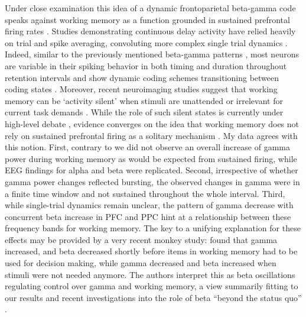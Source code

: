 Under close examination this idea of a dynamic frontoparietal beta-gamma code speaks against working memory as a function grounded in sustained prefrontal firing rates \parencite{Funahashi1989,Fuster1971,Goldman-Rakic1995,Pasternak2005}. Studies demonstrating continuous delay activity have relied heavily on trial and spike averaging, convoluting more complex single trial dynamics \parencite{Rainer2002,Shafi2007}. Indeed, similar to the previously mentioned beta-gamma patterns \parencite{Lundqvist2016}, most neurons are variable in their spiking behavior in both timing and duration throughout retention intervals and show dynamic coding schemes transitioning between coding states \parencite{Cromer2010,Durstewitz2006,Spaak2017,Stokes2013}. Moreover, recent neuroimaging studies suggest that working memory can be ‘activity silent’ when stimuli are unattended or irrelevant for current task demands \parencite{Lewis-Peacock2012,Stokes2015,Wolff2015,Wolff2017}. While the role of such silent states is currently under high-level debate \parencite{Christophel2018}, evidence converges on the idea that working memory does not rely on sustained prefrontal firing as a solitary mechanism \parencite{Lundqvist2018,Spaak2017}. My data agrees with this notion. First, contrary to \textcite{Haegens2010} we did not observe an overall increase of gamma power during working memory as would be expected from sustained firing, while EEG findings for alpha and beta were replicated. Second, irrespective of whether gamma power changes reflected bursting, the observed changes in gamma were in a finite time window and not sustained throughout the whole interval. Third, while single-trial dynamics remain unclear, the pattern of gamma decrease with concurrent beta increase in PFC and PPC hint at a relationship between these frequency bands for working memory. 
The key to a unifying explanation for these effects may be provided by a very recent monkey study: \textcite{Lundqvist2018} found that gamma increased, and beta decreased shortly before items in working memory had to be used for decision making, while gamma decreased and beta increased when stimuli were not needed anymore. The authors interpret this as beta oscillations regulating control over gamma and working memory, a view summarily fitting to our results and recent investigations into the role of beta “beyond the status quo” \parencite{Haegens2017,Ludwig2018,Lundqvist2018,Spitzer2017}. 

